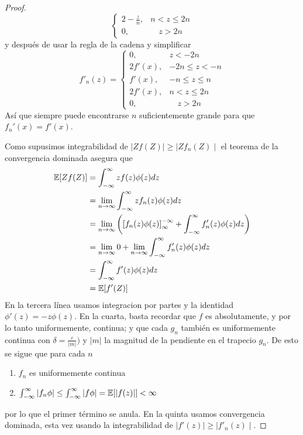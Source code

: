 \documentclass[main.tex]{subfiles}
\begin{document}
\begin{theorem}
\begin{proof}
\begin{equation*}
\begin{cases}
                2 - \frac{z}{n}, & n < z \leq 2n \\
                0, & \quad z > 2n
            \end{cases}
        \end{equation*}
        y después de usar la regla de la cadena y simplificar
        \begin{equation*}
            f'_n(z) = 
            \begin{cases}
                0, & z < -2n \\
                2f'(x), & -2n \leq z < -n \\
                f'(x), & -n \leq z \leq n \\
                2f'(x), & n < z \leq 2n \\
                0, & \quad z > 2n
            \end{cases}
        \end{equation*}
        Así que siempre puede encontrarse $n$ suficientemente grande para que $f_n'(x) = f'(x)$.
        
        Como supusimos integrabilidad de $\mid Zf(Z) \mid \geq \mid Z f_n(Z)\mid$ el teorema de la convergencia dominada asegura que
        \begin{align}
        \begin{split}
            \operatorname{\mathbb{E}}[Zf(Z)] &= \int_{-\infty}^\infty zf(z)\phi(z) dz \\
            &= \lim_{n\rightarrow\infty}\int_{-\infty}^\infty zf_n(z)\phi(z) dz \\
            &= \lim_{n\rightarrow\infty}\left(
                    \left[f_n(z)\phi(z) \right]^{-\infty}_\infty  + \int_{-\infty}^\infty f_n'(z)\phi(z)dz
                \right) \\
            &= \lim_{n\rightarrow\infty}0 + \lim_{n\rightarrow\infty}\int_{-\infty}^\infty f_n'(z)\phi(z)dz \\
            &= \int_{-\infty}^\infty f'(z)\phi(z)dz \\
            &= \operatorname{\mathbb{E}}[f'(Z)]
        \end{split}
        \end{align}
        En la tercera línea usamos integracion por partes y la identidad $\phi'(z)=-z\phi(z)$. En la cuarta, basta recordar que $f$ es absolutamente, y por lo tanto uniformemente, continua; y que cada $g_n$ también es uniformemente continua con $\delta = \frac{\varepsilon}{|m|})$ y $|m|$ la magnitud de la pendiente en el trapecio $g_n$. De esto se sigue que para cada $n$
        \begin{enumerate}[label=\roman*.]
            \item $f_n$ es uniformemente continua
            \item $\int_{-\infty}^\infty |f_n\phi| \leq \int_{-\infty}^\infty |f\phi| = \operatorname{\mathbb{E}}[|f(z)|]< \infty$
        \end{enumerate}
        por lo que el primer término se anula. En la quinta usamos convergencia dominada, esta vez usando la integrabilidad de $\mid f'(z)\mid \geq \mid f'_n(z)\mid$. 



\end{proof}
\end{theorem}
\end{document}
